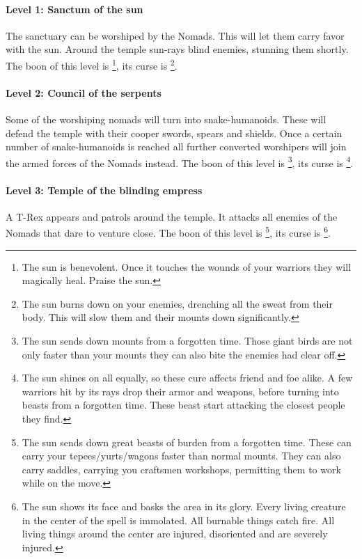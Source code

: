 \documentclass[a4paper]{book}
\begin{document}
			\paragraph{Level 1: Sanctum of the sun}
				The sanctuary can be worshiped by the \gls{Nomads}.
				This will let them carry favor with the sun.
				Around the temple sun-rays blind enemies, stunning them shortly.
				The boon of this level is \footnote{
					The sun is benevolent.
					Once it touches the wounds of your warriors they will magically heal.
					Praise the sun.
				},
				its curse is \footnote{
					The sun burns down on your enemies, drenching all the sweat from their body.
					This will slow them and their mounts down significantly.
				}.

			\paragraph{Level 2: Council of the serpents}
				Some of the worshiping nomads will turn into snake-humanoids.
				These will defend the temple with their cooper swords, spears and shields.
				Once a certain number of snake-humanoids is reached all further converted
				worshipers will join the armed forces of the \gls{Nomads} instead.
				The boon of this level is \footnote{
					The sun sends down mounts from a forgotten time.
					Those giant birds are not only faster than your mounts
					they can also bite the enemies had clear off.
				},
				its curse is \footnote{
					The sun shines on all equally, so these cure affects friend and foe alike.
					A few warriors hit by its rays drop their armor and weapons,
					before turning into beasts from a forgotten time.
					These beast start attacking the closest people they find.
				}.

			\paragraph{Level 3: Temple of the blinding empress}
				A T-Rex appears and patrols around the temple.
				It attacks all enemies of the \gls{Nomads} that dare to venture close.
				The boon of this level is \footnote{
					The sun sends down great beasts of burden from a forgotten time.
					These can carry your tepees/yurts/wagons faster than normal mounts.
					They can also carry saddles, carrying you craftsmen workshops,
					permitting them to work while on the move.
				},
				its curse is \footnote{
					The sun shows its face and basks the area in its glory.
					Every living creature in the center of the spell is immolated.
					All burnable things catch fire.
					All living things around the center are injured, disoriented
					and are severely injured.
				}.
\end{document}
